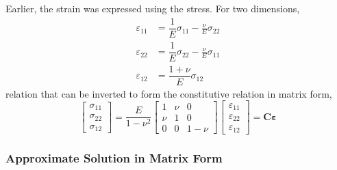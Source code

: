 \documentclass[11pt, a4paper]{article}
\numberwithin{equation}{section}
\begin{document}
Earlier, the strain was expressed using the stress. For two dimensions, 
\begin{align*}
\varepsilon_{11} &=  \dfrac{1}{E} \sigma_{11} - \frac{\nu}{E}\sigma_{22}\\
\varepsilon_{22} &= \dfrac{1}{E} \sigma_{22} - \frac{\nu}{E}\sigma_{11}\\
\varepsilon_{12} &= \dfrac{1 + \nu}{E} \sigma_{12} 
\end{align*}
relation that can be inverted to form the constitutive relation in matrix form,
\begin{equation}
\begin{bmatrix}
\sigma_{11} \\
\sigma_{22} \\
\sigma_{12}
\end{bmatrix}
=
\dfrac{E}{1- \nu^2}
\begin{bmatrix}
1 & \nu & 0 \\
\nu & 1 & 0 \\
0 & 0 & 1 - \nu
\end{bmatrix} 
\begin{bmatrix}
\varepsilon_{11} \\
\varepsilon_{22}\\
\varepsilon_{12}
\end{bmatrix}
=
\mathbf{C} \boldsymbol \varepsilon
\end{equation}

\subsubsection{Approximate Solution in Matrix Form}
\end{document}
